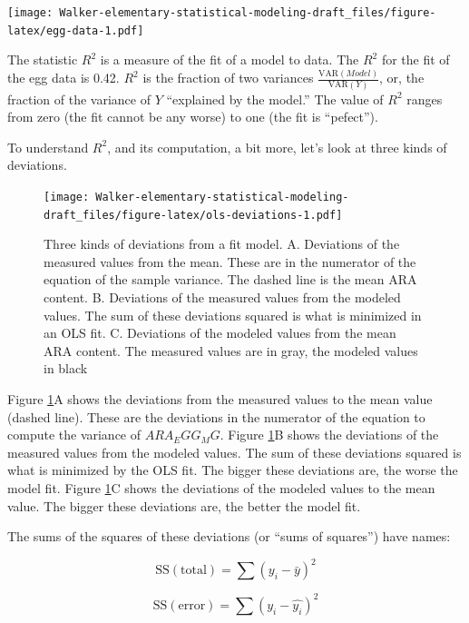 \documentclass[]{book}
\begin{document}
\texttt{[image: Walker-elementary-statistical-modeling-draft\_files/figure-latex/egg-data-1.pdf]}

The statistic \(R^2\) is a measure of the fit of a model to data. The \(R^2\) for the fit of the egg data is 0.42. \(R^2\) is the fraction of two variances \(\frac{\mathrm{VAR}(Model)}{\mathrm{VAR}(Y)}\), or, the fraction of the variance of \(Y\) ``explained by the model.'' The value of \(R^2\) ranges from zero (the fit cannot be any worse) to one (the fit is ``pefect'').

To understand \(R^2\), and its computation, a bit more, let's look at three kinds of deviations.

\begin{figure}
\centering
\texttt{[image: Walker-elementary-statistical-modeling-draft\_files/figure-latex/ols-deviations-1.pdf]}
\caption{\label{fig:ols-deviations}Three kinds of deviations from a fit model. A. Deviations of the measured values from the mean. These are in the numerator of the equation of the sample variance. The dashed line is the mean ARA content. B. Deviations of the measured values from the modeled values. The sum of these deviations squared is what is minimized in an OLS fit. C. Deviations of the modeled values from the mean ARA content. The measured values are in gray, the modeled values in black}
\end{figure}

Figure \ref{fig:ols-deviations}A shows the deviations from the measured values to the mean value (dashed line). These are the deviations in the numerator of the equation to compute the variance of \(ARA_EGG_MG\). Figure \ref{fig:ols-deviations}B shows the deviations of the measured values from the modeled values. The sum of these deviations squared is what is minimized by the OLS fit. The bigger these deviations are, the worse the model fit. Figure \ref{fig:ols-deviations}C shows the deviations of the modeled values to the mean value. The bigger these deviations are, the better the model fit.

The sums of the squares of these deviations (or ``sums of squares'') have names:

\begin{equation}
\mathrm{SS(total)} = \sum{(y_i - \bar{y})^2}
\end{equation}

\begin{equation}
\mathrm{SS(error)} = \sum{(y_i - \hat{y_i})^2}
\end{equation}
\end{document}
